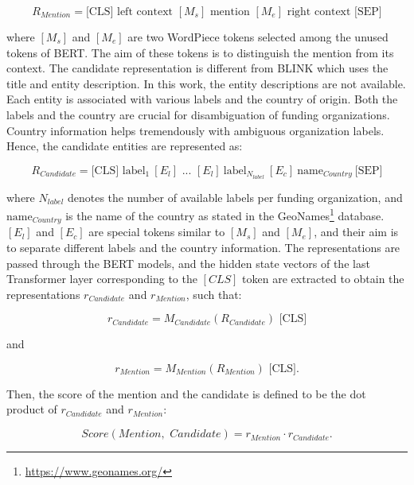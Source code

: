\documentclass{report}
\theoremstyle{definition}
\theoremstyle{remark}
\begin{document}
\begin{equation}
    R_{Mention} = \text{[CLS]} \text{ left context } [M_s] \text{ mention }  [M_e] \text{ right context } \text{[SEP]}
\end{equation}

\noindent where $[M_s]$ and $[M_e]$ are two WordPiece tokens selected among the unused tokens of BERT. The aim of these tokens is to distinguish the mention from its context. 
The candidate representation is different from BLINK which uses the title and entity description. In this work, the entity descriptions are not available. Each entity is associated with various labels and the country of origin. Both the labels and the country are crucial for disambiguation of funding organizations. Country information helps tremendously with ambiguous organization labels. Hence, the candidate entities are represented as:

\begin{equation}
    R_{Candidate} = \text{[CLS] } \text{label}_{1} \ [E_l] \text{ ... } [E_l] \ \text{label}_{N_{label}} \ [E_c] \ \text{name}_{Country} \ \text{[SEP]}
\end{equation}

\noindent where $N_{label}$ denotes the number of available labels per funding organization, and $\text{name}_{Country}$ is the name of the country as stated in the GeoNames\footnote{\url{https://www.geonames.org/}} database. $[E_l]$ and $[E_c]$ are special tokens similar to $[M_s]$ and $[M_e]$, and their aim is to separate different labels and the country information. The representations are passed through the BERT models, and the hidden state vectors of the last Transformer layer corresponding to the $[CLS]$ token are extracted to obtain the representations $r_{Candidate}$ and $r_{Mention}$, such that:

\begin{equation}
    r_{Candidate} = M_{Candidate}(R_{Candidate}) \text{ [CLS]}
\end{equation}

and 

\begin{equation}
    r_{Mention} = M_{Mention}(R_{Mention})\text{ [CLS].}
\end{equation}

Then, the score of the mention and the candidate is defined to be the dot product of $r_{Candidate}$ and $r_{Mention}$:

\begin{equation}
    Score(\textit{Mention},\textit{ Candidate}) = r_{Mention} \cdot r_{Candidate}.
\end{equation}
\end{document}
